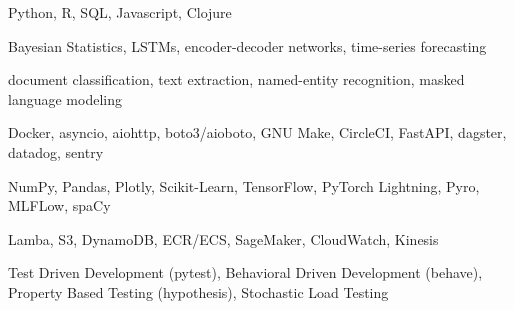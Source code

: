 \begin{cvskills}

	{Python, R, SQL, Javascript, Clojure}

	{Bayesian Statistics, LSTMs, encoder-decoder networks, time-series forecasting}

	{document classification, text extraction, named-entity recognition, masked language modeling}

	{Docker, asyncio, aiohttp, boto3/aioboto, GNU Make, CircleCI, FastAPI, dagster, datadog, sentry}

	{NumPy, Pandas, Plotly, Scikit-Learn, TensorFlow, PyTorch Lightning, Pyro, MLFLow, spaCy}

	{Lamba, S3, DynamoDB, ECR/ECS, SageMaker, CloudWatch, Kinesis}
        
        {Test Driven Development (pytest), Behavioral Driven Development (behave), Property Based Testing (hypothesis), Stochastic Load Testing}

\end{cvskills}
